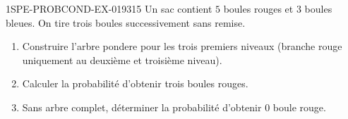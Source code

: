\begin{exercice}{1SPE-PROBCOND-EX-019}{3}{15}
Un sac contient $5$ boules rouges et $3$ boules bleues. On tire trois boules successivement sans remise.

\begin{enumerate}
  \item Construire l'arbre pondere pour les trois premiers niveaux (branche rouge uniquement au deuxième et troisième niveau).
  \item Calculer la probabilité d'obtenir trois boules rouges.
  \item Sans arbre complet, déterminer la probabilité d'obtenir $0$ boule rouge.
\end{enumerate}
\end{exercice}
